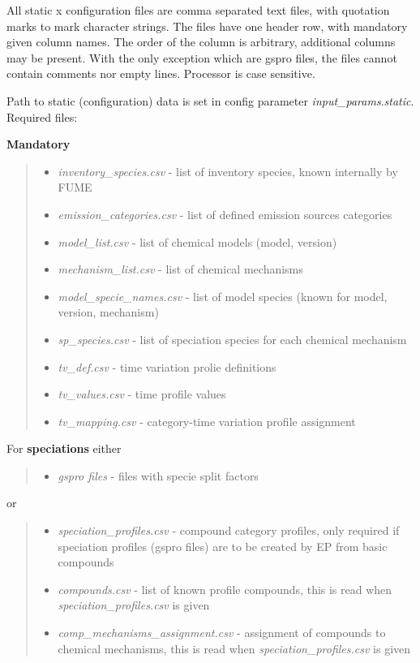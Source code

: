 \documentclass[a4paper,11pt]{article}
\begin{document}
All static x configuration files are comma separated text files, with
quotation marks to mark character strings. The files have one header
row, with mandatory given column names. The order of the column is
arbitrary, additional columns may be present. With the only exception
which are gspro files, the files cannot contain comments nor empty
lines. Processor is case sensitive.

Path to static (configuration) data is set in config parameter
\emph{input\_params}.\emph{static}. Required files:

\textbf{Mandatory}

\begin{quote}
\begin{itemize}
\item
  \emph{inventory\_species.csv} - list of inventory species, known
  internally by FUME
\item
  \emph{emission\_categories.csv} - list of defined emission sources
  categories
\item
  \emph{model\_list.csv} - list of chemical models (model, version)
\item
  \emph{mechanism\_list.csv} - list of chemical mechanisms
\item
  \emph{model\_specie\_names.csv} - list of model species (known for
  model, version, mechanism)
\item
  \emph{sp\_species.csv} - list of speciation species for each chemical
  mechanism
\item
  \emph{tv\_def.csv} - time variation prolie definitions
\item
  \emph{tv\_values.csv} - time profile values
\item
  \emph{tv\_mapping.csv} - category-time variation profile assignment
\end{itemize}
\end{quote}

For \textbf{speciations} either

\begin{quote}
\begin{itemize}
\item
  \emph{gspro files} - files with specie split factors
\end{itemize}
\end{quote}

or

\begin{quote}
\begin{itemize}
\item
  \emph{speciation\_profiles.csv} - compound category profiles, only
  required if speciation profiles (gspro files) are to be created by EP
  from basic compounds
\item
  \emph{compounds.csv} - list of known profile compounds, this is read
  when \emph{speciation\_profiles.csv} is given
\item
  \emph{comp\_mechanisms\_assignment.csv} - assignment of compounds to
  chemical mechanisms, this is read when \emph{speciation\_profiles.csv}
  is given
\end{itemize}
\end{quote}
\end{document}
